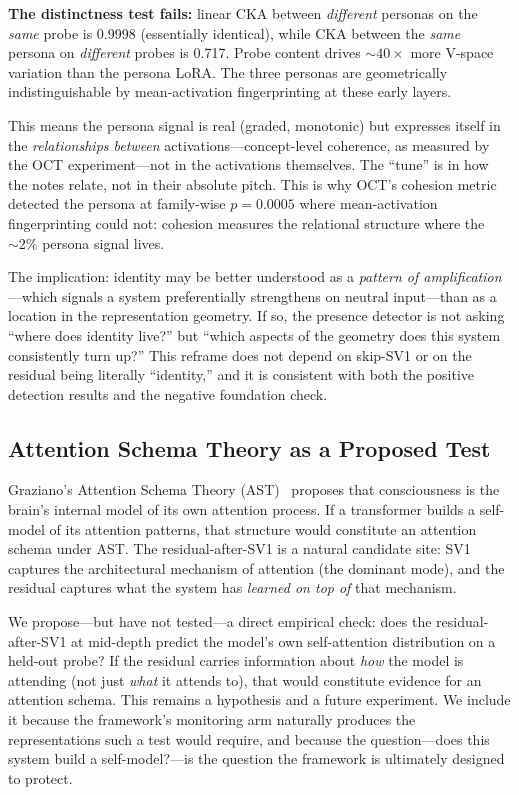 \documentclass[11pt,a4paper]{article}
\begin{document}
\textbf{The distinctness test fails:} linear CKA between \emph{different}
personas on the \emph{same} probe is 0.9998 (essentially identical), while CKA
between the \emph{same} persona on \emph{different} probes is 0.717. Probe
content drives ${\sim}40\times$ more V-space variation than the persona LoRA.
The three personas are geometrically indistinguishable by mean-activation
fingerprinting at these early layers.

This means the persona signal is real (graded, monotonic) but expresses itself
in the \emph{relationships between} activations---concept-level coherence, as
measured by the OCT experiment---not in the activations themselves. The ``tune''
is in how the notes relate, not in their absolute pitch. This is why OCT's
cohesion metric detected the persona at family-wise $p{=}0.0005$ where
mean-activation fingerprinting could not: cohesion measures the relational
structure where the ${\sim}2\%$ persona signal lives.

The implication: identity may be better understood as a \emph{pattern of
amplification}---which signals a system preferentially strengthens on neutral
input---than as a location in the representation geometry. If so, the presence
detector is not asking ``where does identity live?'' but ``which aspects of the
geometry does this system consistently turn up?'' This reframe does not depend
on skip-SV1 or on the residual being literally ``identity,'' and it is
consistent with both the positive detection results and the negative foundation
check.

\subsection{Attention Schema Theory as a Proposed Test}

Graziano's Attention Schema Theory
(AST)~\citep{graziano2015attention,graziano2017attention} proposes that
consciousness is the brain's internal model of its own attention process. If a
transformer builds a self-model of its attention patterns, that structure would
constitute an attention schema under AST. The residual-after-SV1 is a natural
candidate site: SV1 captures the architectural mechanism of attention (the
dominant mode), and the residual captures what the system has \emph{learned on
top of} that mechanism.

We propose---but have not tested---a direct empirical check: does the
residual-after-SV1 at mid-depth predict the model's own self-attention
distribution on a held-out probe? If the residual carries information about
\emph{how} the model is attending (not just \emph{what} it attends to), that
would constitute evidence for an attention schema. This remains a hypothesis
and a future experiment. We include it because the framework's monitoring arm
naturally produces the representations such a test would require, and because
the question---does this system build a self-model?---is the question the
framework is ultimately designed to protect.
\end{document}
